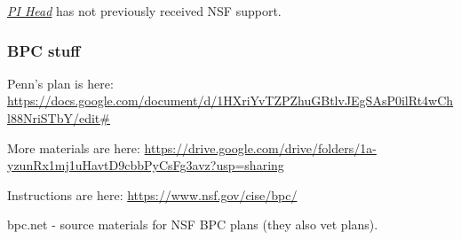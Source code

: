 \emph{\underline{PI Head}} has not previously received NSF support.

%

\ifdraft
\subsubsection*{BPC stuff}

Penn's plan is here: \url{https://docs.google.com/document/d/1HXriYvTZPZhuGBtlvJEgSAsP0ilRt4wChl88NriSTbY/edit#}

More materials are here: \url{https://drive.google.com/drive/folders/1a-yzunRx1mj1uHavtD9cbbPyCsFg3avz?usp=sharing}

Instructions are here: \url{https://www.nsf.gov/cise/bpc/}

bpc.net - source materials for NSF BPC plans (they also vet plans).

\fi

